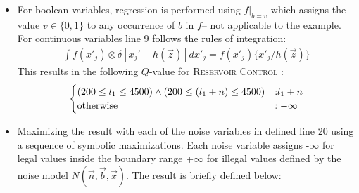 \begin{itemize}
\item For boolean variables, regression is performed using $f|_{b=v}$ which assigns the value $v \in \{ 0,1 \}$ to any occurrence of $b$ in $f$-- not applicable to the example. For continuous variables line 9 follows the rules of integration: 
{\footnotesize
\begin{align}
\int f(x'_j) \otimes \delta[x_j' - h(\vec{z})] dx'_j = f(x'_j) \{ x'_j / h(\vec{z}) \}\nonumber
\end{align}}
This results in the following $Q$-value for \textsc{Reservoir Control} : 
{\footnotesize
\begin{align*}
\begin{cases}
(200 \leq l_1 \leq 4500) \wedge (200 \leq (l_1 + n) \leq 4500) &: \hspace{-1mm} l_1 + n\\
\text{otherwise} &: -\infty\\
\end{cases}
\end{align*}
}
\item Maximizing the result with each of the noise variables in defined line 20 using a sequence of symbolic maximizations. Each noise variable assigns -$\infty$ for legal values inside the boundary range +$\infty$ for illegal values defined by the noise model $N(\vec{n},\vec{b},\vec{x})$. The result is briefly defined below:

\end{itemize}

